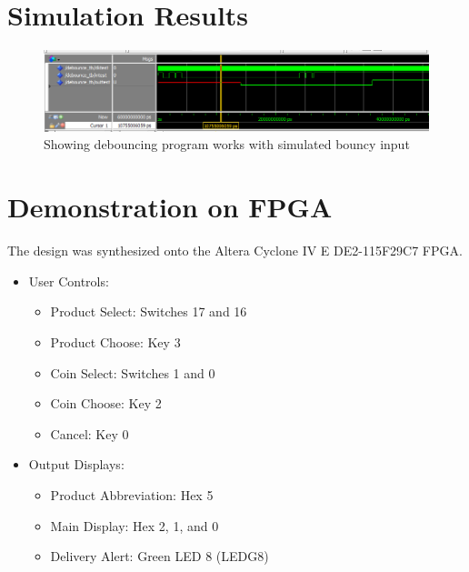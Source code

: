 \documentclass[12pt]{article}
\begin{document}
\section{Simulation Results} \label{simresults}

\begin{figure}[H]
\begin{center}
\includegraphics[scale=0.6]{debounce_sim.png}
\caption{Showing debouncing program works with simulated bouncy input}
\label{fig:simdb}
\end{center}
\end{figure}

\newpage

\section{Demonstration on FPGA} \label{demo}
The design was synthesized onto the Altera Cyclone IV E DE2-115F29C7 FPGA.
\begin{itemize}
\item User Controls:
	\begin{itemize}
	\item Product Select: Switches 17 and 16
	\item Product Choose: Key 3
	\item Coin Select: Switches 1 and 0
	\item Coin Choose: Key 2
	\item Cancel: Key 0
	\end{itemize}
\item Output Displays:
	\begin{itemize}
	\item Product Abbreviation: Hex 5
	\item Main Display: Hex 2, 1, and 0
	\item Delivery Alert: Green LED 8 (LEDG8)
	\end{itemize}
\end{itemize}
\end{document}
